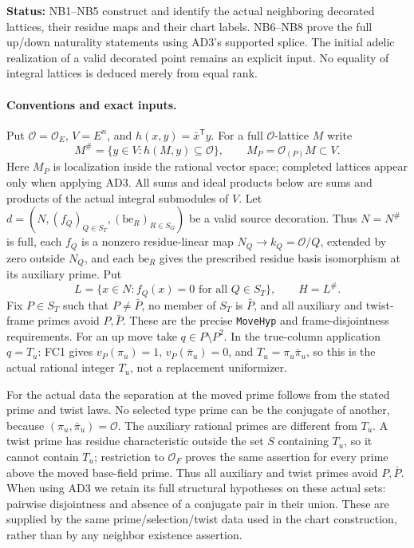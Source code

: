\documentclass[11pt,a4paper]{article}
\numberwithin{equation}{section}
\theoremstyle{remark}\newtheorem{remark}[theorem]{Remark}
\newcommand{\status}[1]{\textbf{Status:} #1}
\begin{document}
\status{NB1--NB5 construct and identify the actual neighboring decorated
lattices, their residue maps and their chart labels. NB6--NB8 prove the
full up/down naturality statements using AD3's supported splice. The
initial adelic realization of a valid decorated point remains an explicit
input. No equality of integral lattices is deduced merely from equal rank.}

\paragraph{Conventions and exact inputs.}
Put $\mathcal O=\mathcal O_E$, $V=E^n$, and
$h(x,y)=\bar x^{\mathsf T}y$. For a full $\mathcal O$-lattice $M$ write
\[
 M^\#=\{y\in V:h(M,y)\subseteq\mathcal O\},\qquad
 M_P=\mathcal O_{(P)}M\subset V.
\]
Here $M_P$ is localization inside the rational vector space; completed
lattices appear only when applying AD3. All sums and ideal products
below are sums and products of the actual integral submodules of $V$.
Let $d=(N,(f_Q)_{Q\in S_T},(\mathrm{be}_R)_{R\in S_G})$ be a valid
source decoration. Thus $N=N^\#$ is full, each $f_Q$ is a nonzero
residue-linear map $N_Q\to k_Q=\mathcal O/Q$, extended by zero outside
$N_Q$, and each $\mathrm{be}_R$ gives the prescribed residue basis
isomorphism at its auxiliary prime. Put
\[
 L=\{x\in N:f_Q(x)=0\text{ for all }Q\in S_T\},\qquad H=L^\#.
\]
Fix $P\in S_T$ such that $P\ne\bar P$, no member of $S_T$ is $\bar P$,
and all auxiliary and twist-frame primes avoid $P,\bar P$. These are
the precise \texttt{MoveHyp} and frame-disjointness requirements.
For an up move take $q\in P\setminus P^2$. In the true-column application
$q=T_u$: FC1 gives $v_P(\pi_u)=1$, $v_P(\bar\pi_u)=0$, and
$T_u=\pi_u\bar\pi_u$, so this is the actual rational integer $T_u$,
not a replacement uniformizer.

For the actual data the separation at the moved prime follows from
the stated prime and twist laws. No selected type prime can be the
conjugate of another, because $(\pi_u,\bar\pi_u)=\mathcal O$.
The auxiliary rational primes are different from $T_u$. A twist
prime has residue characteristic outside the set $S$ containing
$T_u$, so it cannot contain $T_u$; restriction to $\mathcal O_F$
proves the same assertion for every prime above the moved base-field
prime. Thus all auxiliary and twist primes avoid $P,\bar P$.
When using AD3 we retain its full structural hypotheses on these
actual sets: pairwise disjointness and absence of a conjugate pair
in their union. These are supplied by the same prime/selection/twist
data used in the chart construction, rather than by any neighbor
existence assertion.
\end{document}
